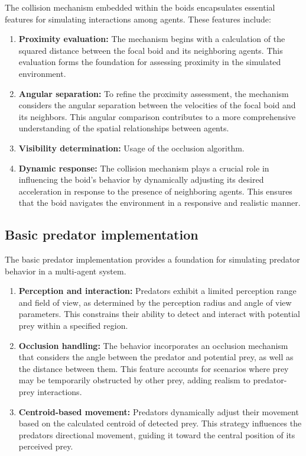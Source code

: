 \documentclass[9pt]{pnas-new}
\begin{document}
The collision mechanism embedded within the boids encapsulates essential features for simulating interactions among agents. These features include:
\begin{enumerate}
	\item \textbf{Proximity evaluation:}
	The mechanism begins with a calculation of the squared distance between the focal boid and its neighboring agents. 
	This evaluation forms the foundation for assessing proximity in the simulated environment.
	\item \textbf{Angular separation:}
	To refine the proximity assessment, the mechanism considers the angular separation between the velocities of the focal boid and its neighbors. 
	This angular comparison contributes to a more comprehensive understanding of the spatial relationships between agents.
	\item \textbf{Visibility determination:} 
	Usage of the occlusion algorithm.
	\item \textbf{Dynamic response:}
	The collision mechanism plays a crucial role in influencing the boid's behavior by dynamically adjusting its desired acceleration in response to the presence of neighboring agents. 
	This ensures that the boid navigates the environment in a responsive and realistic manner.
\end{enumerate}

\subsection*{Basic predator implementation}

The basic predator implementation provides a foundation for simulating predator behavior in a multi-agent system.
\begin{enumerate}
	\item \textbf{Perception and interaction:}
	Predators exhibit a limited perception range and field of view, as determined by the perception radius and angle of view parameters. 
	This constrains their ability to detect and interact with potential prey within a specified region.
	\item \textbf{Occlusion handling:}
	The behavior incorporates an occlusion mechanism that considers the angle between the predator and potential prey, as well as the distance between them. 
	This feature accounts for scenarios where prey may be temporarily obstructed by other prey, adding realism to predator-prey interactions.
	\item \textbf{Centroid-based movement:}
	Predators dynamically adjust their movement based on the calculated centroid of detected prey. 
	This strategy influences the predators directional movement, guiding it toward the central position of its perceived prey.
\end{enumerate}
\end{document}
